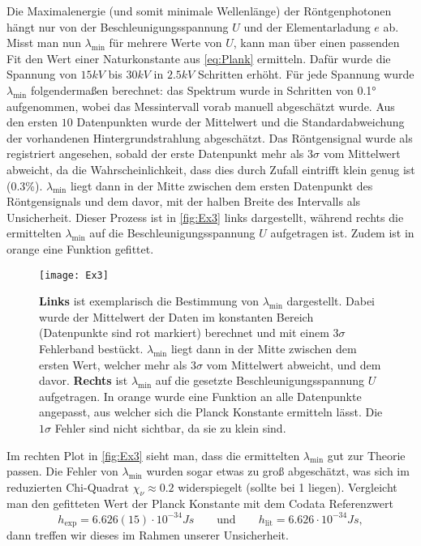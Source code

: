 Die Maximalenergie (und somit minimale Wellenlänge) der Röntgenphotonen hängt nur von der Beschleunigungsspannung \( U \) und der Elementarladung \( e \) ab. Misst man nun \( \lambda_{\mathrm{min}} \) für mehrere Werte von \( U \), kann man über einen passenden Fit den Wert einer Naturkonstante aus \autoref{eq:Plank} ermitteln. Dafür wurde die Spannung von \( 15 \unit{kV} \) bis \( 30 \unit{kV} \) in \( 2.5 \unit{kV} \) Schritten erhöht. Für jede Spannung wurde \( \lambda_{\mathrm{min}} \) folgendermaßen berechnet: das Spektrum wurde in Schritten von \ang{0.1} aufgenommen, wobei das Messintervall vorab manuell abgeschätzt wurde. Aus den ersten \( 10 \) Datenpunkten wurde der Mittelwert und die Standardabweichung der vorhandenen Hintergrundstrahlung abgeschätzt. Das Röntgensignal wurde als registriert angesehen, sobald der erste Datenpunkt mehr als \( 3\sigma \) vom Mittelwert abweicht, da die Wahrscheinlichkeit, dass dies durch Zufall eintrifft klein genug ist (0.3\%). \( \lambda_{\mathrm{min}} \) liegt dann in der Mitte zwischen dem ersten Datenpunkt des Röntgensignals und dem davor, mit der halben Breite des Intervalls als Unsicherheit. Dieser Prozess ist in \autoref{fig:Ex3} links dargestellt, während rechts die ermittelten \( \lambda_{\mathrm{min}} \) auf die Beschleunigungsspannung \( U \) aufgetragen ist. Zudem ist in orange eine Funktion gefittet.

\begin{figure}[H]
	\centering
	\texttt{[image: Ex3]}
	\caption{\textbf{Links} ist exemplarisch die Bestimmung von \( \lambda_{\text{min}} \) dargestellt. Dabei wurde der Mittelwert der Daten im konstanten Bereich (Datenpunkte sind rot markiert) berechnet und mit einem \( 3\sigma \) Fehlerband bestückt. \( \lambda_{\text{min}} \) liegt dann in der Mitte zwischen dem ersten Wert, welcher mehr als \( 3\sigma \) vom Mittelwert abweicht, und dem davor. \textbf{Rechts} ist \( \lambda_{\text{min}} \) auf die gesetzte Beschleunigungsspannung \( U \) aufgetragen. In orange wurde eine Funktion an alle Datenpunkte angepasst, aus welcher sich die Planck Konstante ermitteln lässt. Die \( 1\sigma \) Fehler sind nicht sichtbar, da sie zu klein sind.}
	\label{fig:Ex3}
\end{figure}

Im rechten Plot in \autoref{fig:Ex3} sieht man, dass die ermittelten \( \lambda_{\mathrm{min}} \) gut zur Theorie passen. Die Fehler von \( \lambda_{\mathrm{min}} \) wurden sogar etwas zu groß abgeschätzt, was sich im reduzierten Chi-Quadrat \( \chi_\nu \approx 0.2 \) widerspiegelt (sollte bei 1 liegen). Vergleicht man den gefitteten Wert der Planck Konstante mit dem Codata Referenzwert \autocite{codata}
\begin{equation*}
	h_{\text{exp}} = 6.626(15) \cdot 10^{-34} \unit{Js} \qquad\text{und}\qquad h_{\text{lit}} = 6.626 \cdot 10^{-34} \unit{Js},
\end{equation*}
dann treffen wir dieses im Rahmen unserer Unsicherheit.

